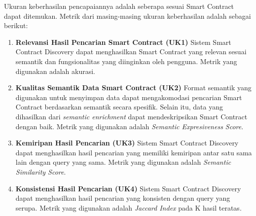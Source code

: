 
Ukuran keberhasilan pencapaiannya adalah seberapa sesuai Smart Contract dapat ditemukan. Metrik dari masing-masing ukuran keberhasilan adalah sebagai berikut:

\begin{enumerate}
	\item \textbf{Relevansi Hasil Pencarian Smart Contract (UK1)} \newline
	      Sistem Smart Contract Discovery dapat menghasilkan Smart Contract yang relevan sesuai semantik dan fungsionalitas yang diinginkan oleh pengguna. Metrik yang digunakan adalah akurasi.

	\item \textbf{Kualitas Semantik Data Smart Contract (UK2)} \newline
	      Format semantik yang digunakan untuk menyimpan data dapat mengakomodasi pencarian Smart Contract berdasarkan semantik secara spesifik. Selain itu, data yang dihasilkan dari \textit{semantic enrichment} dapat mendeskripsikan Smart Contract dengan baik. Metrik yang digunakan adalah \textit{Semantic Expresiveness Score}.

	\item \textbf{Kemiripan Hasil Pencarian (UK3)} \newline
	      Sistem Smart Contract Discovery dapat menghasilkan hasil pencarian yang memiliki kemiripan antar satu sama lain dengan query yang sama. Metrik yang digunakan adalah \textit{Semantic Similarity Score}.

	\item \textbf{Konsistensi Hasil Pencarian (UK4)} \newline
	      Sistem Smart Contract Discovery dapat menghasilkan hasil pencarian yang konsisten dengan query yang serupa. Metrik yang digunakan adalah \textit{Jaccard Index} pada K hasil teratas.


\end{enumerate}
